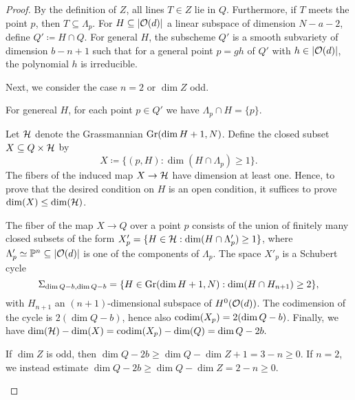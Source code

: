 \begin{proof}
	By the definition of $Z$, all lines $T\in Z$ lie in $Q$. Furthermore, if $T$ meets the point $p$, then $T\subseteq \Lambda_p$.
	For $H\subseteq\lvert\mathcal{O}(d)\rvert$ a linear subspace of dimension $N-a-2$, define $Q'\coloneqq H\cap Q$. For general $H$, the subscheme $Q'$ is a smooth subvariety of dimension $b-n+1$ such that for a general point $p=gh$ of $Q'$ with $h\in \lvert\mathcal{O}(d)\rvert$, the polynomial $h$ is irreducible.


	Next, we consider the case $n=2$ or $\dim Z$ odd.
	\begin{claim}
	For genereal $H$, for each point $p\in Q'$ we have $\Lambda_p \cap H =\{p\}$.
	\end{claim}
	\begin{subproof}

	Let $\mathcal{H}$ denote the Grassmannian $\operatorname{Gr}(\dim H+1, N)$. Define the closed subset $X\subseteq Q\times \mathcal{H}$ by
	$$X\coloneqq \{(p,H):\dim(H\cap \Lambda_p)\geq 1\}.$$ The fibers of the induced map $X\to \mathcal{H}$ have dimension at least one. Hence, to prove that the desired condition on $H$ is an open condition, it suffices to prove $\dim(X) \leq \dim(\mathcal{H})$.

	The fiber of the map  $X\to Q$ over a point $p$ consists of the union of finitely many closed subsets of the form $X'_p = \{H\in \mathcal{H} : \dim(H\cap \Lambda'_p)\geq 1\}$, where $\Lambda'_p\simeq \mathbb{P}^n\subseteq \lvert\mathcal{O}(d)\rvert$ is one of the components of $\Lambda_p$. The space $X'_p$ is a Schubert cycle
	\[
		\Sigma_{\dim Q - b,\dim Q - b} = \{H\in \operatorname{Gr}(\dim H+1, N) : \dim(H \cap H_{n+1}) \geq 2\},
	\]
	with $H_{n+1}$ an $(n+1)$-dimensional subspace of $H^0(\mathcal{O}(d))$. The codimension of the cycle is $2(\dim Q - b)$, hence also $\operatorname{codim}(X_p) = 2(\dim Q -b)$. Finally, we have $\dim(\mathcal{H})-\dim(X) = \operatorname{codim}(X_p) - \dim(Q) = \dim Q - 2b.$

	If $\dim Z$ is odd, then $\dim Q - 2b \geq \dim Q - \dim Z + 1 = 3-n\geq 0$. If $n=2$, we instead estimate $\dim Q - 2b \geq \dim Q - \dim Z = 2-n\geq 0$. \end{subproof}


\end{proof}
